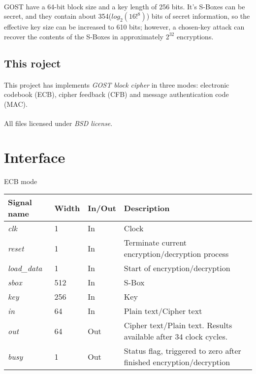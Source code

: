 \documentclass[a4paper,12pt]{article}
\begin{document}
\paragraph{}
GOST have a 64-bit block size and a key length of 256 bits.
It's S-Boxes can be secret, and they contain about 354($log_2(16!^8)$) bits of
secret information, so the effective key size can be increased to 610 bits;
however, a chosen-key attack can recover the contents of the S-Boxes
in approximately $2^{32}$ encryptions.

\subsection{This roject}
\paragraph{}
This project has implements \textsl{GOST block cipher} in three modes:
electronic codebook (ECB), cipher feedback (CFB) and message authentication code (MAC).
\paragraph{}
All files licensed under \textsl{BSD license}.


\newpage
\section{Interface}

\paragraph{}
ECB mode\\
{\renewcommand{\arraystretch}{1.2}
\begin{tabularx}{\textwidth}{l|l l X}
\hline
Signal name & Width & In/Out & Description\\
\hline
\textsl{clk}        & 1   & In  & Clock\\
\textsl{reset}      & 1   & In  & Terminate current encryption/decryption process \\
\textsl{load\_data} & 1   & In  & Start of encryption/decryption \\
\textsl{sbox}       & 512 & In  & S-Box \\
\textsl{key}        & 256 & In  & Key \\
\textsl{in}         & 64  & In  & Plain text/Cipher text \\
\textsl{out}        & 64  & Out & Cipher text/Plain text. Results available after 34 clock cycles. \\
\textsl{busy}       & 1   & Out & Status flag, triggered to zero after finished encryption/decryption \\
\hline
\end{tabularx}}
\end{document}
